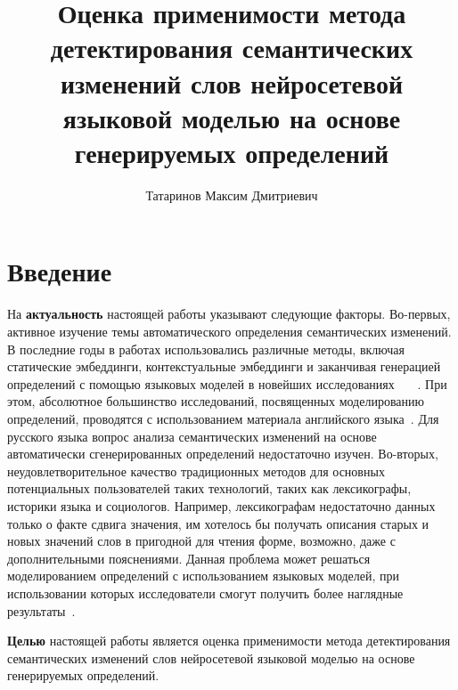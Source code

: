 \documentclass[LI,VKR]{HSEUniversity}
\title{Оценка применимости метода детектирования семантических изменений слов нейросетевой
языковой моделью на основе генерируемых определений}
\author{Татаринов Максим Дмитриевич}
\begin{document}
\maketitle

\chapter*{Введение}

На \textbf{актуальность} настоящей работы указывают следующие факторы.
Во-первых, активное изучение темы автоматического определения семантических изменений.
В последние годы в работах использовались различные методы, включая статические эмбеддинги,
контекстуальные эмбеддинги и заканчивая генерацией определений с помощью языковых моделей
в новейших исследованиях
~~\cite{kutuzov-etal-2018-diachronic,rodina2020elmo,DefinitionGenerationMainArticle}~.
При этом, абсолютное большинство исследований, посвященных моделированию определений,
проводятся с использованием материала английского языка~\cite{DefinitionModelingReviewAndDatasetAnalysis}.
Для русского языка вопрос анализа семантических изменений на основе автоматически
сгенерированных определений недостаточно изучен.
Во-вторых, неудовлетворительное качество традиционных методов для основных потенциальных
пользователей таких технологий, таких как лексикографы, историки языка и социологов.
Например, лексикографам недостаточно данных только о факте сдвига значения, им хотелось бы
получать описания старых и новых значений слов в пригодной для чтения форме, возможно,
даже с дополнительными пояснениями.
Данная проблема может решаться моделированием определений с использованием языковых
моделей, при использовании которых исследователи смогут получить более наглядные
результаты~\cite{DefinitionGenerationMainArticle}.

\textbf{Целью} настоящей работы является оценка применимости метода детектирования семантических
изменений слов нейросетевой языковой моделью на основе генерируемых определений.
\end{document}
